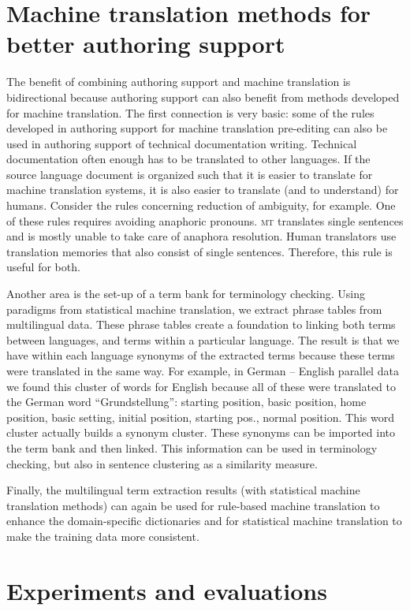 \documentclass[output=paper]{LSP/langsci}
\begin{document}
\section{Machine translation methods for better authoring support}\label{sec:siegel:5}

The benefit of combining authoring support and machine translation is bidirectional because authoring support can also benefit from methods developed for machine translation. The first connection is very basic: some of the rules developed in authoring support for machine translation pre-editing can also be used in authoring support of technical documentation writing. Technical documentation often enough has to be translated to other languages. If the source language document is organized such that it is easier to translate for machine translation systems, it is also easier to translate (and to understand) for humans. Consider the rules concerning reduction of ambiguity, for example. One of these rules requires avoiding anaphoric pronouns. \textsc{mt} translates single sentences and is mostly unable to take care of anaphora resolution. Human translators use translation memories that also consist of single sentences. Therefore, this rule is useful for both.

Another area is the set-up of a term bank for terminology checking. Using paradigms from statistical machine translation, we extract phrase tables from multilingual data. These phrase tables create a foundation to linking both terms between languages, and terms within a particular language.  
The result is that we have within each language synonyms of the extracted terms because these terms were translated in the same way. For example, in German -- English parallel data we found this cluster of words for English because all of these were translated to the German word ``Grundstellung'': starting position, basic position, home position, basic setting, initial position, starting pos., normal position. This word cluster actually builds a synonym cluster. These synonyms can be imported into the term bank and then linked. This information can be used in terminology checking, but also in sentence clustering as a similarity measure.

Finally, the multilingual term extraction results (with statistical machine translation methods) can again be used for rule-based machine translation to enhance the domain-specific dictionaries and for statistical machine translation to make the training data more consistent.

\section{Experiments and evaluations}\label{sec:siegel:6}
\end{document}
